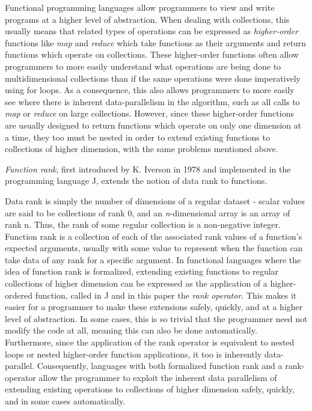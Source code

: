 Functional programming languages allow programmers to view and write programs at a higher level of abstraction.
When dealing with collections, this usually means that related types of operations can be expressed as \textit{higher-order} functions like \textit{map} and \textit{reduce} which take functions as their arguments and return functions which operate on collections.
These higher-order functions often allow programmers to more easily understand what operations are being done to multidimensional collections than if the same operations were done imperatively using for loops.
As a consequence, this also allows programmers to more easily see where there is inherent data-parallelism in the algorithm, such as all calls to \textit{map} or \textit{reduce} on large collections.
However, since these higher-order functions are usually designed to return functions which operate on only one dimension at a time, they too must be nested in order to extend existing functions to collections of higher dimension, with the same problems mentioned above.

\textit{Function rank}, first introduced by K. Iverson in 1978\cite{opandfunc} and implemented in the programming language J, extends the notion of data rank to functions.\begin{comment}TODO cite\end{comment}%
Data rank is simply the number of dimensions of a regular dataset - scalar values are said to be collections of rank 0, and an \textit{n}-dimensional array is an array of rank n.
Thus, the rank of some regular collection is a non-negative integer.%
Function rank is a collection of each of the associated rank values of a function's expected arguments, usually with some value to represent when the function can take data of any rank for a specific argument.
In functional languages where the idea of function rank is formalized, extending existing functions to regular collections of higher dimension can be expressed as the application of a higher-ordered function, called in J and in this paper the \textit{rank operator}.%
This makes it easier for a programmer to make these extensions safely, quickly, and at a higher level of abstraction.
In some cases, this is so trivial that the programmer need not modify the code at all, meaning this can also be done automatically.
Furthermore, since the application of the rank operator is equivalent to nested loops or nested higher-order function applications, it too is inherently data-parallel.
Consequently, languages with both formalized function rank and a rank-operator allow the programmer to exploit the inherent data parallelism of extending existing operations to collections of higher dimension safely, quickly, and in some cases automatically.

